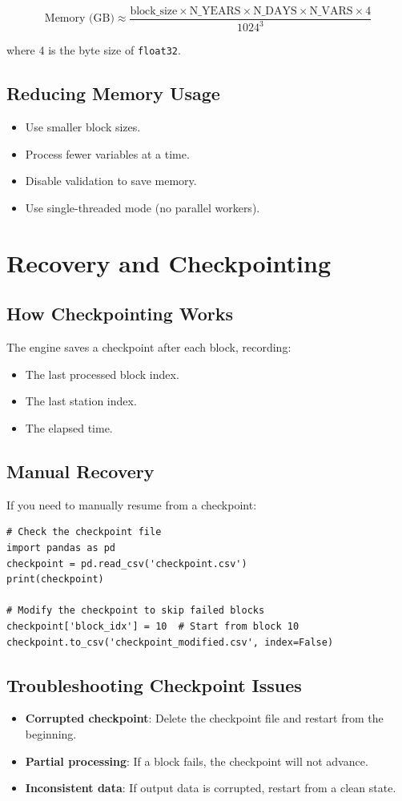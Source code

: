 ﻿\documentclass[12pt,a4paper]{report}
\begin{document}
\[
\text{Memory (GB)} \approx \frac{\text{block\_size} \times \text{N\_YEARS} \times \text{N\_DAYS} \times \text{N\_VARS} \times 4}{1024^3}
\]

where 4 is the byte size of \texttt{float32}.

\subsection{Reducing Memory Usage}
\begin{itemize}
    \item Use smaller block sizes.
    \item Process fewer variables at a time.
    \item Disable validation to save memory.
    \item Use single-threaded mode (no parallel workers).
\end{itemize}

\section{Recovery and Checkpointing}

\subsection{How Checkpointing Works}
The engine saves a checkpoint after each block, recording:
\begin{itemize}
    \item The last processed block index.
    \item The last station index.
    \item The elapsed time.
\end{itemize}

\subsection{Manual Recovery}
If you need to manually resume from a checkpoint:

\begin{lstlisting}[caption=Manual Recovery]
# Check the checkpoint file
import pandas as pd
checkpoint = pd.read_csv('checkpoint.csv')
print(checkpoint)

# Modify the checkpoint to skip failed blocks
checkpoint['block_idx'] = 10  # Start from block 10
checkpoint.to_csv('checkpoint_modified.csv', index=False)
\end{lstlisting}

\subsection{Troubleshooting Checkpoint Issues}
\begin{itemize}
    \item \textbf{Corrupted checkpoint}: Delete the checkpoint file and restart from the beginning.
    \item \textbf{Partial processing}: If a block fails, the checkpoint will not advance.
    \item \textbf{Inconsistent data}: If output data is corrupted, restart from a clean state.
\end{itemize}
\end{document}
